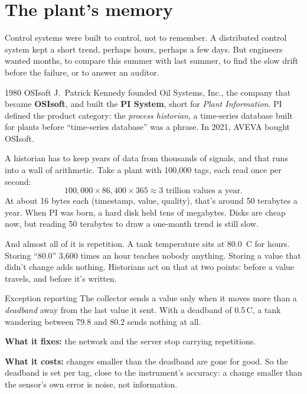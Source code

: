 \section{The plant's memory}

Control systems were built to control, not to remember. A distributed control
system kept a short trend, perhaps hours, perhaps a few days. But engineers
wanted months, to compare this summer with last summer, to find the slow drift
before the failure, or to answer an auditor.

\begin{history}{1980 \textperiodcentered{} OSIsoft}
J.\ Patrick Kennedy founded Oil Systems, Inc., the company that became
\textbf{OSIsoft}, and built the \textbf{PI System}, short for \emph{Plant
Information}. PI defined the product category: the \emph{process historian}, a
time-series database built for plants before ``time-series database'' was a
phrase. In 2021, AVEVA bought OSIsoft.
\end{history}

A historian has to keep years of data from thousands of signals, and that runs
into a wall of arithmetic. Take a plant with 100{,}000 tags, each read once per
second:
\[
  100{,}000 \times 86{,}400 \times 365 \approx 3 \text{ trillion values a year.}
\]
At about 16 bytes each (timestamp, value, quality), that's around 50 terabytes a
year. When PI was born, a hard disk held tens of megabytes. Disks are cheap now,
but reading 50 terabytes to draw a one-month trend is still slow.

And almost all of it is repetition. A tank temperature sits at 80.0\,\textdegree
C for hours. Storing ``80.0'' 3{,}600 times an hour teaches nobody anything.
Storing a value that didn't change adds nothing. Historians act on that at two
points: before a value travels, and before it's written.

\begin{concept}{Exception reporting}
The collector sends a value only when it moves more than a \emph{deadband} away
from the last value it sent. With a deadband of 0.5\,\textdegree C, a tank
wandering between 79.8 and 80.2 sends nothing at all.

\textbf{What it fixes:} the network and the server stop carrying repetitions.

\textbf{What it costs:} changes smaller than the deadband are gone for good. So
the deadband is set per tag, close to the instrument's accuracy: a change
smaller than the sensor's own error is noise, not information.
\end{concept}


